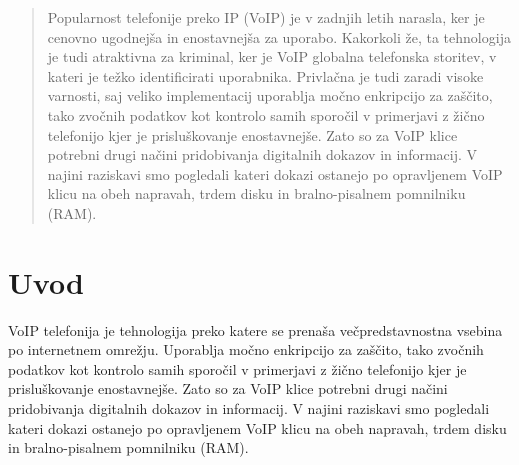 \documentclass{acm_proc_article-sp}
\begin{document}
\date{30 July 1999}

\maketitle
\begin{abstract}
Popularnost telefonije preko IP (VoIP) je v zadnjih letih narasla, ker je cenovno ugodnejša in enostavnejša za uporabo. Kakorkoli že, ta tehnologija je tudi atraktivna za kriminal, ker je VoIP globalna telefonska storitev, v kateri je težko identificirati uporabnika. Privlačna je tudi zaradi visoke varnosti, saj veliko implementacij uporablja močno enkripcijo za zaščito, tako zvočnih podatkov kot kontrolo samih sporočil v primerjavi z žično telefonijo kjer je prisluškovanje enostavnejše. Zato so za VoIP klice potrebni drugi načini pridobivanja digitalnih dokazov in informacij. V najini raziskavi smo pogledali kateri dokazi ostanejo po opravljenem VoIP klicu na obeh napravah, trdem disku in bralno-pisalnem pomnilniku (RAM).

\end{abstract}



\section{Uvod}
VoIP telefonija je tehnologija preko katere se prenaša večpredstavnostna vsebina po internetnem omrežju. Uporablja močno enkripcijo za zaščito, tako zvočnih podatkov kot kontrolo samih sporočil v primerjavi z žično telefonijo kjer je prisluškovanje enostavnejše. Zato so za VoIP klice potrebni drugi načini pridobivanja digitalnih dokazov in informacij. V najini raziskavi smo pogledali kateri dokazi ostanejo po opravljenem VoIP klicu na obeh napravah, trdem disku in bralno-pisalnem pomnilniku (RAM).
\end{document}
